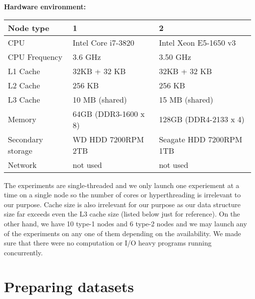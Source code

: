 \documentclass[11pt]{article}
\begin{document}
\newpage
{\bf Hardware environment:}

\vspace{1mm}
\begin{tabular}{|l|l|l|}
	\hline
	Node type &  1 & 2 \\\hline
	CPU & Intel Core i7-3820 & Intel Xeon E5-1650 v3 \\\hline
	CPU Frequency & 3.6 GHz & 3.50 GHz \\\hline
	L1 Cache & 32KB + 32 KB & 32KB + 32 KB\\\hline
	L2 Cache & 256 KB & 256 KB\\\hline
	L3 Cache & 10 MB (shared) & 15 MB (shared) \\\hline
	Memory & 64GB (DDR3-1600 x 8) & 128GB (DDR4-2133 x 4) \\\hline
	Secondary storage & WD HDD 7200RPM 2TB & Seagate HDD 7200RPM 1TB
	\\\hline
	Network & not used & not used \\\hline
\end{tabular}
\vspace{1mm}

The experiments are single-threaded and we only
launch one experiement at a time on a single node so the number of
cores or hyperthreading is irrelevant to our purpose. Cache size is
also irrelevant for our purpose as our data structure size far exceeds
even the L3 cache size (listed below just for reference). On the other
hand, we have 10 type-1 nodes and 6 type-2 nodes and we may launch any
of the experiments on any one of them depending on the availability.
We made sure that there were no computation or I/O heavy programs
running concurrently.


\section{Preparing datasets}
\end{document}
